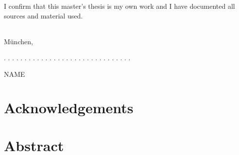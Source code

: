 \documentclass[a4paper]{article}
\newcommand{\thesisauthor}{NAME}
\begin{document}
\newpage	
\thispagestyle{empty}
\vspace*{\fill}
\noindent I confirm that this master's thesis is my own work and I have documented all sources and material used.\\\\
\vspace{1cm}

München,

\vspace{3cm}

. . . . . . . . . . . . . . . . . . . . . . . . . . . . . . .
\vspace{0.1cm}

\thesisauthor{}

\newpage
\hypertarget{acknowledgements}{%
\section*{Acknowledgements}\label{acknowledgements}}
\pagestyle{plain}
\clearpairofpagestyles
\ofoot*{\fontsize{8pt}{0pt}\pagemark} %
\setcounter{page}{1}    %

\newpage
\hypertarget{abstract}{%
\section*{Abstract}\label{abstract}}

\newpage
\tableofcontents
\clearpage

\newpage
\listoffigures
{}

\newpage
\listoftables
{}
\end{document}
